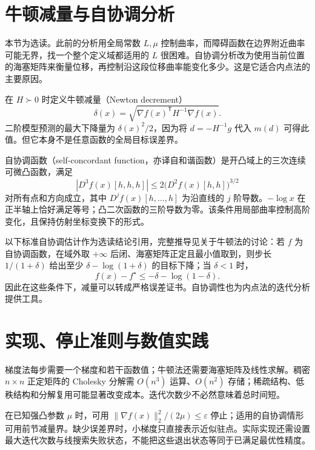 \section{牛顿减量与自协调分析}

本节为选读。此前的分析用全局常数 $L,\mu$ 控制曲率，而障碍函数在边界附近曲率可能无界，找一个整个定义域都适用的 $L$ 很困难。自协调分析改为使用当前位置的海塞矩阵来衡量位移，再控制沿这段位移曲率能变化多少。这是它适合内点法的主要原因。

在 $H\succ0$ 时定义牛顿减量（Newton decrement）
\[
 \delta(x)=\sqrt{\nabla f(x)^{\mathsf T}H^{-1}\nabla f(x)}.
\]
二阶模型预测的最大下降量为 $\delta(x)^2/2$，因为将 $d=-H^{-1}g$ 代入 $m(d)$ 可得此值。但它本身不是任意函数的全局目标误差界。

自协调函数（self-concordant function，亦译自和谐函数）是开凸域上的三次连续可微凸函数，满足
\[
 |D^3f(x)[h,h,h]|\leq2\bigl(D^2f(x)[h,h]\bigr)^{3/2}
\]
对所有点和方向成立，其中 $D^j f(x)[h,\ldots,h]$ 为沿直线的 $j$ 阶导数。$-\log x$ 在正半轴上恰好满足等号；凸二次函数的三阶导数为零。该条件用局部曲率控制高阶变化，且保持仿射坐标变换下的形式。

以下标准自协调估计作为选读结论引用，完整推导见\cite{boyd-vandenberghe}关于牛顿法的讨论：若 $f$ 为自协调函数，在域外取 $+\infty$ 后闭、海塞矩阵正定且最小值取到，则步长 $1/(1+\delta)$ 给出至少 $\delta-\log(1+\delta)$ 的目标下降；当 $\delta<1$ 时，
\[
 f(x)-f^\star\leq-\delta-\log(1-\delta).
\]
因此在这些条件下，减量可以转成严格误差证书。自协调性也为内点法的迭代分析提供工具。

\section{实现、停止准则与数值实践}

梯度法每步需要一个梯度和若干函数值；牛顿法还需要海塞矩阵及线性求解。稠密 $n\times n$ 正定矩阵的 Cholesky 分解需 $O(n^3)$ 运算、$O(n^2)$ 存储；稀疏结构、低秩结构和分解复用可能显著改变成本。迭代次数少不必然意味着总时间短。

在已知强凸参数 $\mu$ 时，可用 $\|\nabla f(x)\|_2^2/(2\mu)\leq\varepsilon$ 停止；适用的自协调情形可用前节减量界。缺少误差界时，小梯度只直接表示近似驻点。实际实现还需设置最大迭代次数与线搜索失败状态，不能把这些退出状态等同于已满足最优性精度。

